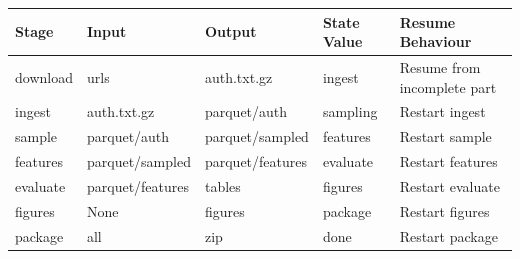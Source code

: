 \begin{tabular}{lllll}
\toprule
Stage & Input & Output & State Value & Resume Behaviour \\
\midrule
download & urls & auth.txt.gz & ingest & Resume from incomplete part \\
ingest & auth.txt.gz & parquet/auth & sampling & Restart ingest \\
sample & parquet/auth & parquet/sampled & features & Restart sample \\
features & parquet/sampled & parquet/features & evaluate & Restart features \\
evaluate & parquet/features & tables & figures & Restart evaluate \\
figures & None & figures & package & Restart figures \\
package & all & zip & done & Restart package \\
\bottomrule
\end{tabular}
